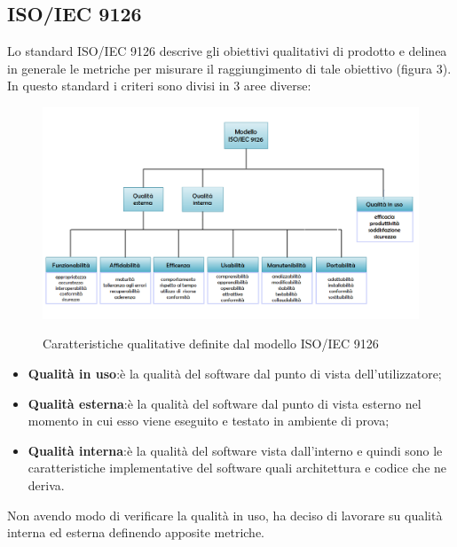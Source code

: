 \subsection{ISO/IEC 9126}
Lo standard ISO/IEC 9126 descrive gli obiettivi qualitativi di prodotto e delinea in generale le metriche per misurare il raggiungimento di tale obiettivo (figura 3). In questo standard i criteri sono divisi in 3 aree diverse:
\begin{figure} [H]
\centering
     \includegraphics[scale=0.5]{../modello/img/iso9126}\\
     \caption{Caratteristiche qualitative definite dal modello ISO/IEC 9126}\label{fig:3}
\end{figure}
\begin{itemize}
\item \textbf{Qualità in uso}:è la qualità del software dal punto di vista dell'utilizzatore;
\item \textbf{Qualità esterna}:è la qualità del software dal punto di vista esterno nel momento in cui esso viene eseguito e testato in ambiente di prova;
\item \textbf{Qualità interna}:è la qualità del software vista dall'interno e quindi sono le caratteristiche implementative del software quali architettura e codice che ne deriva.
\end{itemize}
Non avendo modo di verificare la qualità in uso, \gruppo ha deciso di lavorare su qualità interna ed esterna definendo apposite metriche.
